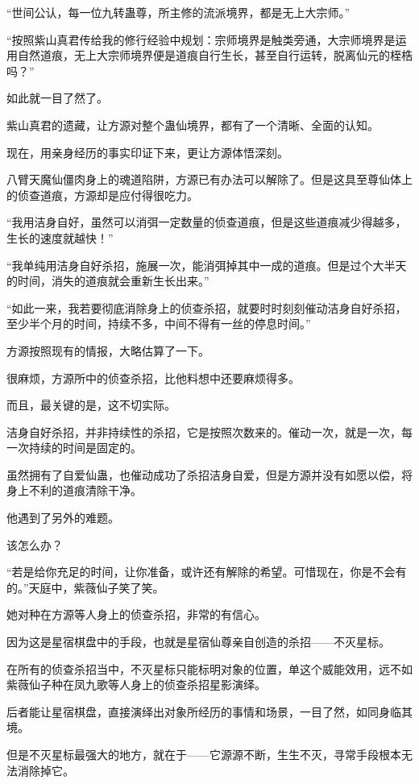 \begin{this_body}
“世间公认，每一位九转蛊尊，所主修的流派境界，都是无上大宗师。”

“按照紫山真君传给我的修行经验中规划：宗师境界是触类旁通，大宗师境界是运用自然道痕，无上大宗师境界便是道痕自行生长，甚至自行运转，脱离仙元的桎梏吗？”

如此就一目了然了。

紫山真君的遗藏，让方源对整个蛊仙境界，都有了一个清晰、全面的认知。

现在，用亲身经历的事实印证下来，更让方源体悟深刻。

八臂天魔仙僵肉身上的魂道陷阱，方源已有办法可以解除了。但是这具至尊仙体上的侦查道痕，方源却是应付得很吃力。

“我用洁身自好，虽然可以消弭一定数量的侦查道痕，但是这些道痕减少得越多，生长的速度就越快！”

“我单纯用洁身自好杀招，施展一次，能消弭掉其中一成的道痕。但是过个大半天的时间，消失的道痕就会重新生长出来。”

“如此一来，我若要彻底消除身上的侦查杀招，就要时时刻刻催动洁身自好杀招，至少半个月的时间，持续不多，中间不得有一丝的停息时间。”

方源按照现有的情报，大略估算了一下。

很麻烦，方源所中的侦查杀招，比他料想中还要麻烦得多。

而且，最关键的是，这不切实际。

洁身自好杀招，并非持续性的杀招，它是按照次数来的。催动一次，就是一次，每一次持续的时间是固定的。

虽然拥有了自爱仙蛊，也催动成功了杀招洁身自爱，但是方源并没有如愿以偿，将身上不利的道痕清除干净。

他遇到了另外的难题。

该怎么办？

“若是给你充足的时间，让你准备，或许还有解除的希望。可惜现在，你是不会有的。”天庭中，紫薇仙子笑了笑。

她对种在方源等人身上的侦查杀招，非常的有信心。

因为这是星宿棋盘中的手段，也就是星宿仙尊亲自创造的杀招——不灭星标。

在所有的侦查杀招当中，不灭星标只能标明对象的位置，单这个威能效用，远不如紫薇仙子种在凤九歌等人身上的侦查杀招星影演绎。

后者能让星宿棋盘，直接演绎出对象所经历的事情和场景，一目了然，如同身临其境。

但是不灭星标最强大的地方，就在于——它源源不断，生生不灭，寻常手段根本无法消除掉它。


\end{this_body}
